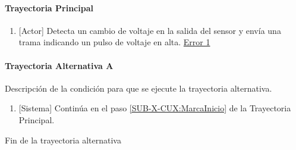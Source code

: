 \paragraph{Trayectoria Principal}
	\begin{enumerate}
		\item \label{SUB-X-CUX:MarcaInicio} {[Actor]} Detecta un cambio de voltaje en la salida del sensor y envía una trama indicando un pulso de voltaje en alta. \hyperref[SUB-M-CU1:Error1]{Error 1} %
	\end{enumerate}

\paragraph{Trayectoria Alternativa A} \label{SUB-M-CU1:TA}
	Descripción de la condición para que se ejecute la trayectoria alternativa.
	\begin{enumerate}[label=A\arabic*.]
		\item {[Sistema]} Continúa en el paso \ref{SUB-X-CUX:MarcaInicio} de la Trayectoria Principal.
	\end{enumerate}
	Fin de la trayectoria alternativa